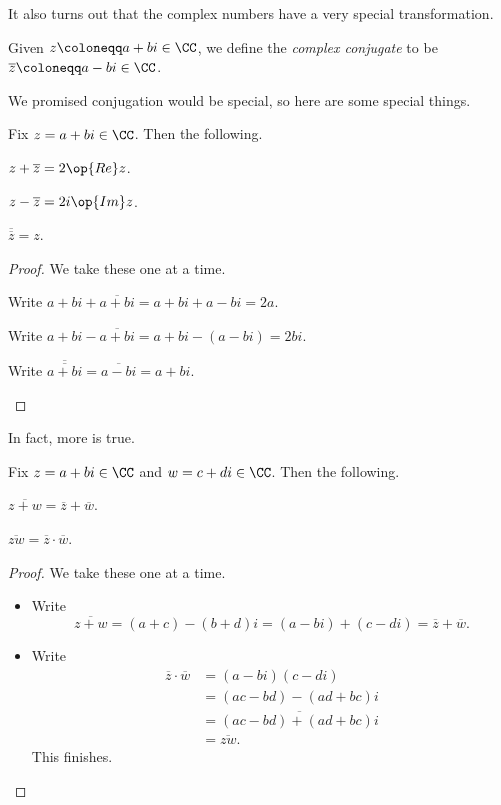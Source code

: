 \documentclass[../notes.tex]{subfiles}
\begin{document}
It also turns out that the complex numbers have a very special transformation.
\begin{definition}[Conjugate]
	Given $z\coloneqq a+bi\in\CC$, we define the \textit{complex conjugate} to be $\overline z\coloneqq a-bi\in\CC$.
\end{definition}
We promised conjugation would be special, so here are some special things.
\begin{proposition} \label{prop:accessreandim}
	Fix $z=a+bi\in\CC$. Then the following.
	\begin{listalph}
		\item $z+\overline z=2\op{Re}z$.
		\item $z-\overline z=2i\op{Im}z$.
		\item $\overline{\overline z}=z$.
	\end{listalph}
\end{proposition}
\begin{proof}
	We take these one at a time.
	\begin{listalph}
		\item Write $a+bi+\overline{a+bi}=a+bi+a-bi=2a$.
		\item Write $a+bi-\overline{a+bi}=a+bi-(a-bi)=2bi$.
		\item Write $\overline{\overline{a+bi}}=\overline{a-bi}=a+bi$.
		\qedhere
	\end{listalph}
\end{proof}
In fact, more is true.
\begin{proposition}
	Fix $z=a+bi\in\CC$ and $w=c+di\in\CC$. Then the following.
	\begin{listalph}
		\item $\overline{z+w}=\overline z+\overline w$.
		\item $\overline{zw}=\overline z\cdot\overline w$.
	\end{listalph}
\end{proposition}
\begin{proof}
	We take these one at a time.
	\begin{itemize}
		\item Write
		\[\overline{z+w}=(a+c)-(b+d)i=(a-bi)+(c-di)=\overline z+\overline w.\]
		\item Write
		\begin{align*}
			\overline z\cdot\overline w &= (a-bi)(c-di) \\
			&= (ac-bd)-(ad+bc)i \\
			&= \overline{(ac-bd)+(ad+bc)i} \\
			&= \overline{zw}.
		\end{align*}
		This finishes.
		\qedhere
	\end{itemize}
\end{proof}
\end{document}
